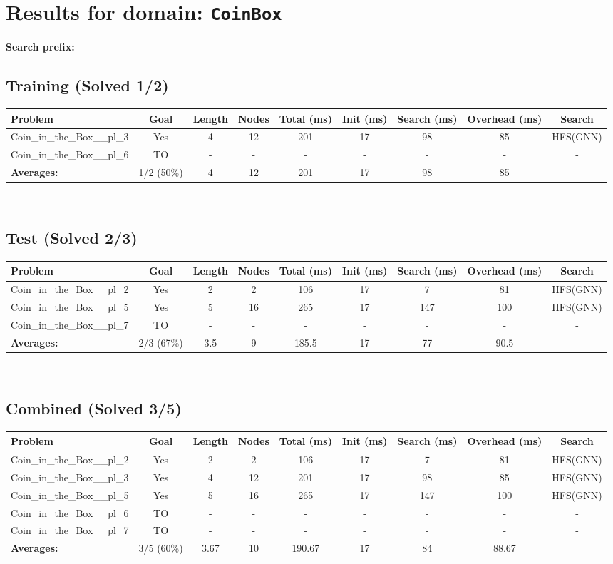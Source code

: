 \documentclass{article}
\begin{document}
\section*{Results for domain: \texttt{CoinBox}}
\textbf{Search prefix:} 
\\[0.5cm]
\subsection*{Training (Solved 1/2)}
\begin{tabular}{lcccccccc}
\toprule
Problem & Goal & Length & Nodes & Total (ms) & Init (ms) & Search (ms) & Overhead (ms) & Search \\
\midrule
Coin\_in\_the\_Box\_\_pl\_3 & Yes & 4 & 12 & 201 & 17 & 98 & 85 & HFS(GNN) \\
Coin\_in\_the\_Box\_\_pl\_6 & TO & - & - & - & - & - & - & - \\
\textbf{Averages:} & 1/2 (50\%) & 4 & 12 & 201 & 17 & 98 & 85 & \\
\bottomrule
\end{tabular}
\\[0.7cm]
\subsection*{Test (Solved 2/3)}
\begin{tabular}{lcccccccc}
\toprule
Problem & Goal & Length & Nodes & Total (ms) & Init (ms) & Search (ms) & Overhead (ms) & Search \\
\midrule
Coin\_in\_the\_Box\_\_pl\_2 & Yes & 2 & 2 & 106 & 17 & 7 & 81 & HFS(GNN) \\
Coin\_in\_the\_Box\_\_pl\_5 & Yes & 5 & 16 & 265 & 17 & 147 & 100 & HFS(GNN) \\
Coin\_in\_the\_Box\_\_pl\_7 & TO & - & - & - & - & - & - & - \\
\textbf{Averages:} & 2/3 (67\%) & 3.5 & 9 & 185.5 & 17 & 77 & 90.5 & \\
\bottomrule
\end{tabular}
\\[0.7cm]
\subsection*{Combined (Solved 3/5)}
\begin{tabular}{lcccccccc}
\toprule
Problem & Goal & Length & Nodes & Total (ms) & Init (ms) & Search (ms) & Overhead (ms) & Search \\
\midrule
Coin\_in\_the\_Box\_\_pl\_2 & Yes & 2 & 2 & 106 & 17 & 7 & 81 & HFS(GNN) \\
Coin\_in\_the\_Box\_\_pl\_3 & Yes & 4 & 12 & 201 & 17 & 98 & 85 & HFS(GNN) \\
Coin\_in\_the\_Box\_\_pl\_5 & Yes & 5 & 16 & 265 & 17 & 147 & 100 & HFS(GNN) \\
Coin\_in\_the\_Box\_\_pl\_6 & TO & - & - & - & - & - & - & - \\
Coin\_in\_the\_Box\_\_pl\_7 & TO & - & - & - & - & - & - & - \\
\textbf{Averages:} & 3/5 (60\%) & 3.67 & 10 & 190.67 & 17 & 84 & 88.67 & \\
\bottomrule
\end{tabular}
\\[0.7cm]
\end{document}
